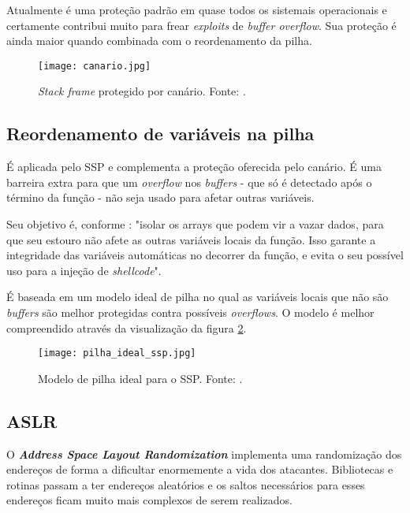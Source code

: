 			
			Atualmente é uma proteção padrão em quase todos os sistemais operacionais e certamente
			contribui muito para frear \textsl{exploits} de \textsl{buffer overflow}. Sua
			proteção é ainda maior quando combinada com o reordenamento da pilha.
			

			\begin{figure}
				\begin{center}
					\texttt{[image: canario.jpg]}
					\caption{\textsl{Stack frame} protegido por canário. Fonte: \cite{Furlan2005}.}
					\label{fig:canario}
				\end{center}
			\end{figure}

		\subsection{Reordenamento de variáveis na pilha}
		\label{subsec:reordenamento_pilha}
			É aplicada pelo SSP e complementa a proteção oferecida pelo canário.
			É uma barreira extra para que um \textsl{overflow} nos \textsl{buffers} - que só
			é detectado após o término da função - não seja usado para afetar outras variáveis.


			Seu objetivo é, conforme \cite{Martins2009}:
			"isolar os arrays que podem vir a vazar dados, para que seu estouro não
			afete as outras variáveis locais da função. Isso garante a integridade das variáveis
            automáticas no decorrer da função, e evita o seu possível uso para a injeção de \textsl{shellcode}".

			
			É baseada em um modelo ideal de pilha no qual as variáveis locais que não
			são \textsl{buffers} são melhor protegidas contra possíveis \textsl{overflows}.
			O modelo é melhor compreendido através da visualização da figura \ref{fig:pilha_ideal_ssp}.

			\begin{figure}
				\begin{center}
					\texttt{[image: pilha\_ideal\_ssp.jpg]}
					\caption{Modelo de pilha ideal para o SSP. Fonte: \cite{Martins2009}.}
					\label{fig:pilha_ideal_ssp}
				\end{center}
			\end{figure}


		\subsection{ASLR}
			O \textsl{\textbf{Address Space Layout Randomization}} implementa uma randomização
			dos endereços de forma a dificultar enormemente a vida dos atacantes.
			Bibliotecas e rotinas passam a ter endereços aleatórios e os saltos necessários
			para esses endereços ficam muito mais complexos de serem realizados.

